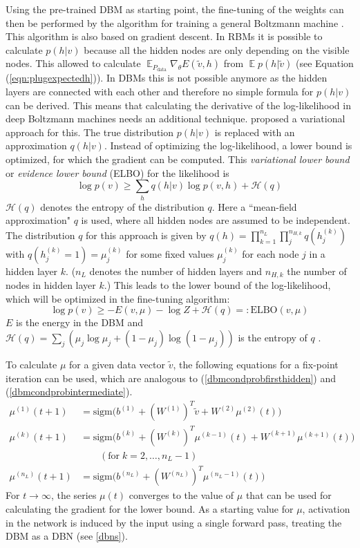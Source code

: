 \documentclass[12pt]{article}
\newcommand{\sigm}{\mathrm{sigm}}
\newcommand{\ELBO}{\mathrm{ELBO}}
\DeclareMathOperator{\EX}{\mathbb{E}}
\begin{document}
Using the pre-trained DBM as starting point, the fine-tuning of the weights can then be performed by the algorithm for training a general Boltzmann machine
\citep{salakhutdinov2009DBMs, salakhutdinov2015generativemodels}.
This algorithm is also based on gradient descent.
In RBMs it is possible to calculate $p(h | v)$ because all the hidden nodes are only depending on the visible nodes.
This allowed to calculate $\EX_{P_{\text{data}}} \nabla_{\!\theta} E(\tilde{v},h)$ from $\EX p(h | \tilde{v})$ (see Equation (\ref{eqn:plugexpectedh})).
In DBMs this is not possible anymore as the hidden layers are connected with each other and therefore no simple formula for $p(h | v)$ can be derived.
This means that calculating the derivative of the log-likelihood in deep Boltzmann machines needs an additional technique.
\cite{salakhutdinov2009DBMs} proposed a variational approach for this.
The true distribution $p(h|v)$  is replaced with an approximation $q(h|v)$.
Instead of optimizing the log-likelihood, a lower bound is optimized, for which the gradient can be computed.
This \emph{variational lower bound} or \emph{evidence lower bound} (ELBO) \citep{blei_variational_2017} for the likelihood is
\[
\log p(v) \geq \sum_h q(h|v) \log p(v,h) + \mathcal{H}(q)
\]
$\mathcal{H}(q)$ denotes the entropy of the distribution $q$.
Here a ``mean-field approximation" $q$ is used, where all hidden nodes are assumed to be independent.
The distribution $q$ for this approach is given by $q(h) = \prod_{k=1}^{n_L} \prod_j^{n_{H,k}} q(h_j^{(k)})$ with $q(h_j^{(k)} = 1) = \mu_j^{(k)}$ for some fixed values $\mu_j^{(k)}$ for each  node $j$ in a hidden layer $k$.
($n_L$ denotes the number of hidden layers and $n_{H,k}$ the number of nodes in hidden layer $k$.)
This leads to the lower bound of the log-likelihood, which will be optimized in the fine-tuning algorithm:
\[
   \log p(v) \geq - E(v, \mu) - \log Z + \mathcal{H}(q) =: \ELBO(v, \mu)
\]
$E$ is the energy in the DBM and $\mathcal{H}(q) = \sum_j \left( \mu_j \log \mu_j + (1- \mu_j) \log ( 1- \mu_j) \right)$ is the entropy of $q$ \citep{sala2012anefficient, salakhutdinov2015generativemodels}.

To calculate $\mu$ for a given data vector $\tilde{v}$, the following equations for a fix-point iteration can be used, which are analogous to (\ref{dbmcondprobfirsthidden}) and (\ref{dbmcondprobintermediate}).
\begin{align*}
\mu^{(1)}(t+1)&= \sigm \bigg( b^{(1)} + (W^{(1)})^T \tilde{v} + W^{(2)} \mu ^{(2)}(t) \bigg) \\
\mu^{(k)}(t+1) &= \sigm \bigg( b^{(k)} + (W^{(k)})^T \mu^{(k-1)}(t) + W^{(k+1)} \mu^{(k+1)}(t) \bigg) \\
&\quad\quad (\text{for} \; k=2,\dots, n_L-1) \\
\mu^{(n_L)}(t+1)&= \sigm \bigg( b^{(n_L)} + (W^{(n_L)})^T \mu^{(n_L-1)}(t) \bigg)
\end{align*}
For  $t \rightarrow \infty$, the series $\mu(t)$ converges to the value of $\mu$ that can be used for calculating the gradient for the lower bound.
As a starting value for $\mu$, activation in the network is induced by the input using a single forward pass, treating the DBM as a DBN (see \ref{dbns}).
\end{document}
